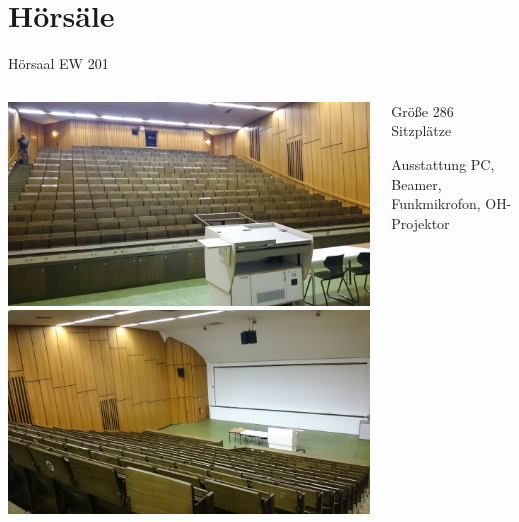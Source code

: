 \documentclass[compress,]{beamer}
\begin{document}
\section{Hörsäle}
\begin{frame}{Hörsaal EW 201}
  \begin{columns}[onlytextwidth]
    \begin{column}{0.5\textwidth}
      \includegraphics[scale=0.04]{images/DSC_0712.JPG}\\
      \includegraphics[scale=0.04]{images/DSC_0711.JPG}
    \end{column}
    \begin{column}{0.4\textwidth}
      \begin{block}{Größe}
        286 Sitzplätze
      \end{block}
      \vspace{1cm}
      \begin{block}{Ausstattung}
        PC, Beamer, Funkmikrofon, OH-Projektor
      \end{block}
    \end{column}
  \end{columns}
\end{frame}
\end{document}
